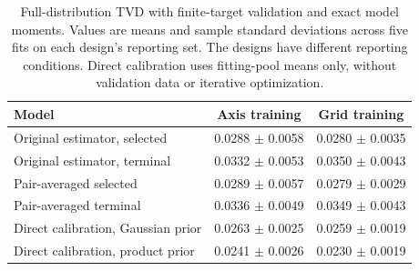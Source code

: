 \begin{table}[t]
\centering
\caption{Full-distribution TVD with finite-target validation and exact model moments. Values are means and sample standard deviations across five fits on each design's reporting set. The designs have different reporting conditions. Direct calibration uses fitting-pool means only, without validation data or iterative optimization.}
\label{tab:gaussian-phase-finite-validation}
\begin{tabular}{lcc}
\toprule
Model & Axis training & Grid training \\
\midrule
Original estimator, selected & 0.0288 $\pm$ 0.0058 & 0.0280 $\pm$ 0.0035 \\
Original estimator, terminal & 0.0332 $\pm$ 0.0053 & 0.0350 $\pm$ 0.0043 \\
Pair-averaged selected & 0.0289 $\pm$ 0.0057 & 0.0279 $\pm$ 0.0029 \\
Pair-averaged terminal & 0.0336 $\pm$ 0.0049 & 0.0349 $\pm$ 0.0043 \\
Direct calibration, Gaussian prior & 0.0263 $\pm$ 0.0025 & 0.0259 $\pm$ 0.0019 \\
Direct calibration, product prior & 0.0241 $\pm$ 0.0026 & 0.0230 $\pm$ 0.0019 \\
\bottomrule
\end{tabular}
\end{table}
